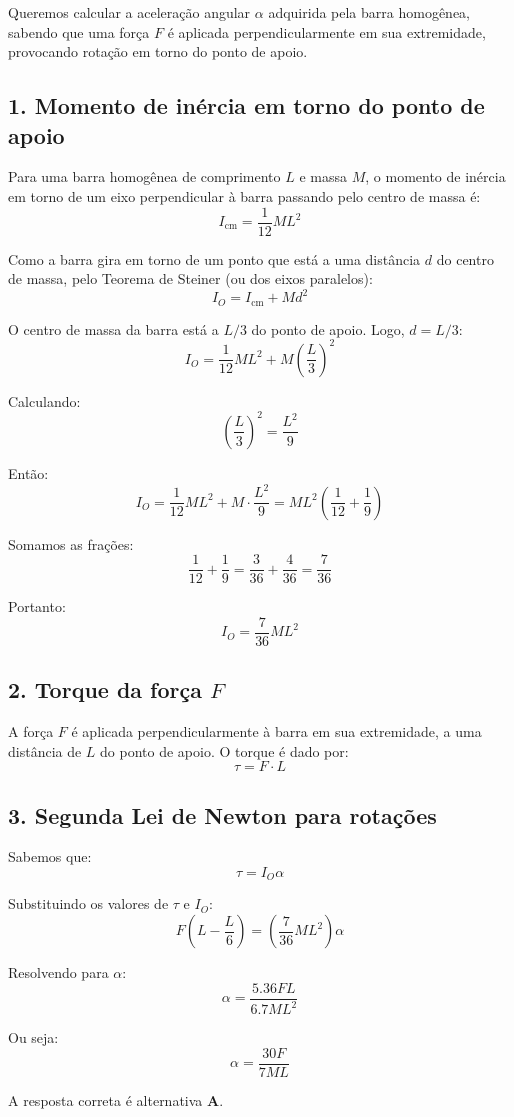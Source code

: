 \begin{flushleft}
Queremos calcular a aceleração angular $\alpha$ adquirida pela barra homogênea, sabendo que uma força $F$ é aplicada perpendicularmente em sua extremidade, provocando rotação em torno do ponto de apoio.

\subsection*{1. Momento de inércia em torno do ponto de apoio}

Para uma barra homogênea de comprimento $L$ e massa $M$, o momento de inércia em torno de um eixo perpendicular à barra passando pelo centro de massa é:
\[
I_{\text{cm}} = \frac{1}{12} M L^2
\]

Como a barra gira em torno de um ponto que está a uma distância $d$ do centro de massa, pelo Teorema de Steiner (ou dos eixos paralelos):
\[
I_O = I_{\text{cm}} + M d^2
\]

O centro de massa da barra está a $L/3$ do ponto de apoio. Logo, $d = L/3$:
\[
I_O = \frac{1}{12} M L^2 + M \left( \frac{L}{3} \right)^2
\]

Calculando:
\[
\left( \frac{L}{3} \right)^2 = \frac{L^2}{9}
\]

Então:
\[
I_O = \frac{1}{12} M L^2 + M \cdot \frac{L^2}{9} = M L^2 \left( \frac{1}{12} + \frac{1}{9} \right)
\]

Somamos as frações:
\[
\frac{1}{12} + \frac{1}{9} = \frac{3}{36} + \frac{4}{36} = \frac{7}{36}
\]

Portanto:
\[
I_O = \frac{7}{36} M L^2
\]

\subsection*{2. Torque da força $F$}

A força $F$ é aplicada perpendicularmente à barra em sua extremidade, a uma distância de $L$ do ponto de apoio. O torque é dado por:
\[
\tau = F \cdot L
\]

\subsection*{3. Segunda Lei de Newton para rotações}

Sabemos que:
\[
\tau = I_O \alpha
\]

Substituindo os valores de $\tau$ e $I_O$:
\[
F \left(L - \frac{L}{6} \right) = \left( \frac{7}{36} M L^2 \right) \alpha
\]

Resolvendo para $\alpha$:
\[
\alpha = \frac{5.36FL}{6.7M L^2}
\]

Ou seja:
\[
\boxed{
\alpha = \frac{30 F}{7ML}
}
\]

A resposta correta é alternativa \colorbox{green!50}{\textbf{A}}.

\end{flushleft}

